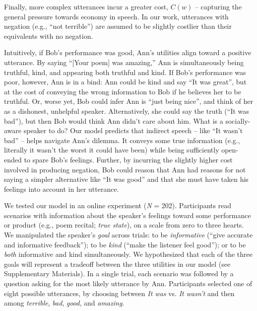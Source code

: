 \documentclass[12pt]{article}
\begin{document}
Finally, more complex utterances incur a greater cost, \(C(w)\) --
capturing the general pressure towards economy in speech. In our work,
utterances with negation (e.g., \enquote{not terrible}) are assumed to
be slightly costlier than their equivalents with no negation.

Intuitively, if Bob's performance was good, Ann's utilities align toward
a positive utterance. By saying \enquote{{[}Your poem{]} was amazing,}
Ann is simultaneously being truthful, kind, and appearing both truthful
and kind. If Bob's performance was poor, however, Ann is in a bind: Ann
could be kind and say \enquote{It was great}, but at the cost of
conveying the wrong information to Bob if he believes her to be
truthful. Or, worse yet, Bob could infer Ann is \enquote{just being
nice}, and think of her as a dishonest, unhelpful speaker.
Alternatively, she could say the truth (\enquote{It was bad}), but then
Bob would think Ann didn't care about him. What is a socially-aware
speaker to do? Our model predicts that indirect speech -- like
\enquote{It wasn't bad} -- helps navigate Ann's dilemma. It conveys some
true information (e.g., literally it wasn't the worst it could have
been) while being sufficiently open-ended to spare Bob's feelings.
Further, by incurring the slightly higher cost involved in producing
negation, Bob could reason that Ann had reasons for not saying a simpler
alternative like \enquote{It was good} and that she must have taken his
feelings into account in her utterance.


We tested our model in an online experiment (\emph{N} = 202).
Participants read scenarios with information about the speaker's
feelings toward some performance or product (e.g., poem recital;
\emph{true state}), on a scale from zero to three hearts. We manipulated
the speaker's \emph{goal} across trials: to be \emph{informative}
(\enquote{give accurate and informative feedback}); to be \emph{kind}
(\enquote{make the listener feel good}); or to be \emph{both}
informative and kind simultaneously. We hypothesized that each of the
three goals will represent a tradeoff between the three utilities in our
model (see Supplementary Materials). In a single trial, each scenario
was followed by a question asking for the most likely utterance by Ann.
Participants selected one of eight possible utterances, by choosing
between \emph{It was} vs. \emph{It wasn't} and then among
\emph{terrible}, \emph{bad}, \emph{good}, and \emph{amazing.}
\end{document}

